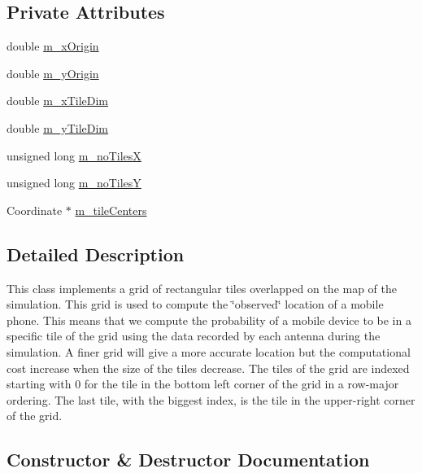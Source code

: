 \subsection*{Private Attributes}
\begin{DoxyCompactItemize}
\item 
double \hyperlink{class_grid_ae109d428ac5489815748e92fdde1b91f}{m\+\_\+x\+Origin}
\item 
double \hyperlink{class_grid_a16b2fc5a6e96ad2d59d59b52db83f4aa}{m\+\_\+y\+Origin}
\item 
double \hyperlink{class_grid_a48c3d1fc34a14bff8b9176558a8b6f4e}{m\+\_\+x\+Tile\+Dim}
\item 
double \hyperlink{class_grid_a497eeffc4a16a021e15ecbc130f4f644}{m\+\_\+y\+Tile\+Dim}
\item 
unsigned long \hyperlink{class_grid_a177bfdc70436c25a1510d1abe19e34c1}{m\+\_\+no\+TilesX}
\item 
unsigned long \hyperlink{class_grid_a8fe14c4781dfd5623922fcc1f9c10130}{m\+\_\+no\+TilesY}
\item 
Coordinate $\ast$ \hyperlink{class_grid_a27b99b13ac7e5bec81f7b8704bc3405a}{m\+\_\+tile\+Centers}
\end{DoxyCompactItemize}


\subsection{Detailed Description}
This class implements a grid of rectangular tiles overlapped on the map of the simulation. This grid is used to compute the \char`\"{}observed\char`\"{} location of a mobile phone. This means that we compute the probability of a mobile device to be in a specific tile of the grid using the data recorded by each antenna during the simulation. A finer grid will give a more accurate location but the computational cost increase when the size of the tiles decrease. The tiles of the grid are indexed starting with 0 for the tile in the bottom left corner of the grid in a row-\/major ordering. The last tile, with the biggest index, is the tile in the upper-\/right corner of the grid. 

\subsection{Constructor \& Destructor Documentation}
\mbox{\label{class_grid_a84b0dc169028f21175a4549afde86153}} 
